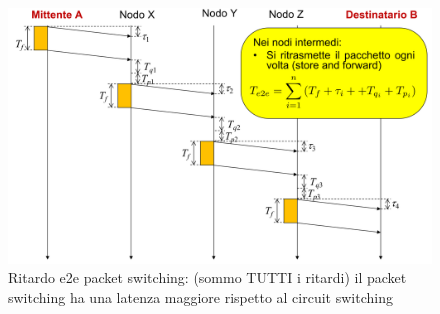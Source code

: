     
    \begin{figure}[h!]
        \centering
        \includegraphics[width=1\textwidth]{images/e2e_packet_switching.png}
        \caption{Ritardo e2e packet switching: (sommo TUTTI i ritardi)
il packet switching ha una latenza maggiore rispetto al circuit switching}
        \label{fig:packet_switching}
    \end{figure}
